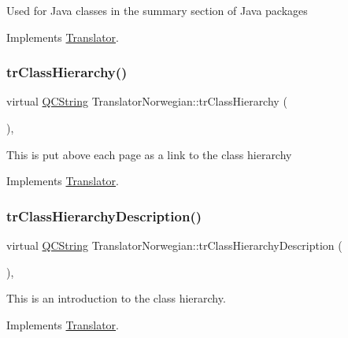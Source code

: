 Used for Java classes in the summary section of Java packages 

Implements \mbox{\hyperlink{class_translator}{Translator}}.

\mbox{\label{class_translator_norwegian_a8b82605ff19493a2549e3946de02a076}} 
\subsubsection{\texorpdfstring{trClassHierarchy()}{trClassHierarchy()}}
{\footnotesize\ttfamily virtual \mbox{\hyperlink{class_q_c_string}{Q\+C\+String}} Translator\+Norwegian\+::tr\+Class\+Hierarchy (\begin{DoxyParamCaption}{ }\end{DoxyParamCaption})\hspace{0.3cm}{\ttfamily [inline]}, {\ttfamily [virtual]}}

This is put above each page as a link to the class hierarchy 

Implements \mbox{\hyperlink{class_translator}{Translator}}.

\mbox{\label{class_translator_norwegian_aeaf48ca1671fc1d9877389cdbfffebc6}} 
\subsubsection{\texorpdfstring{trClassHierarchyDescription()}{trClassHierarchyDescription()}}
{\footnotesize\ttfamily virtual \mbox{\hyperlink{class_q_c_string}{Q\+C\+String}} Translator\+Norwegian\+::tr\+Class\+Hierarchy\+Description (\begin{DoxyParamCaption}{ }\end{DoxyParamCaption})\hspace{0.3cm}{\ttfamily [inline]}, {\ttfamily [virtual]}}

This is an introduction to the class hierarchy. 

Implements \mbox{\hyperlink{class_translator}{Translator}}.

\mbox{\label{class_translator_norwegian_a2eaf23003da213d49b1faa922d4123fd}} 
